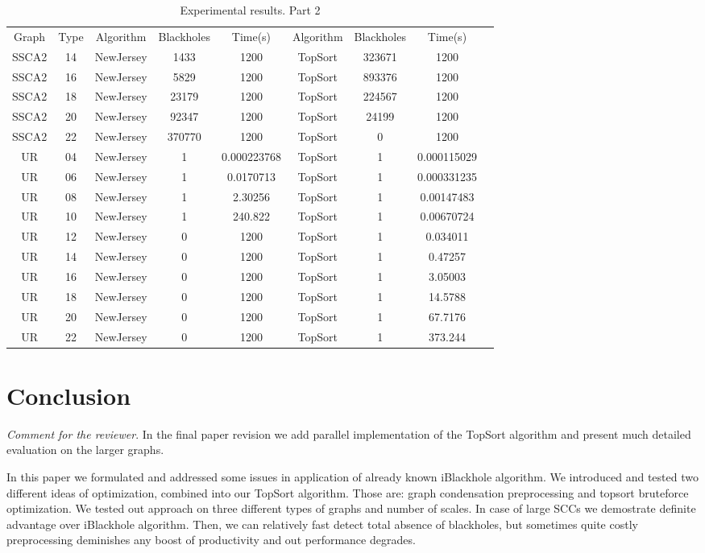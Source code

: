 \documentclass{svproc}
\begin{document}
\begin{table}[]
\caption{Experimental results. Part 2}
\label{tabular:tableresults2}
\begin{center}
\begin{tabular}{c|c|c|c|c|c|c|c|c}
Graph & Type & Algorithm & Blackholes & Time(s) & Algorithm & Blackholes & Time(s) \\
SSCA2 & 14 & NewJersey & 1433 & 1200 & TopSort & 323671 & 1200 \\
SSCA2 & 16 & NewJersey & 5829 & 1200 & TopSort & 893376 & 1200 \\
SSCA2 & 18 & NewJersey & 23179 & 1200 & TopSort & 224567 & 1200 \\
SSCA2 & 20 & NewJersey & 92347 & 1200 & TopSort & 24199 & 1200 \\
SSCA2 & 22 & NewJersey & 370770 & 1200 & TopSort & 0 & 1200 \\
UR & 04 & NewJersey & 1 & 0.000223768 & TopSort & 1 & 0.000115029 \\
UR & 06 & NewJersey & 1 & 0.0170713 & TopSort & 1 & 0.000331235 \\
UR & 08 & NewJersey & 1 & 2.30256 & TopSort & 1 & 0.00147483 \\
UR & 10 & NewJersey & 1 & 240.822 & TopSort & 1 & 0.00670724 \\
UR & 12 & NewJersey & 0 & 1200 & TopSort & 1 & 0.034011 \\
UR & 14 & NewJersey & 0 & 1200 & TopSort & 1 & 0.47257 \\
UR & 16 & NewJersey & 0 & 1200 & TopSort & 1 & 3.05003 \\
UR & 18 & NewJersey & 0 & 1200 & TopSort & 1 & 14.5788 \\
UR & 20 & NewJersey & 0 & 1200 & TopSort & 1 & 67.7176 \\
UR & 22 & NewJersey & 0 & 1200 & TopSort & 1 & 373.244
\end{tabular}
\end{center}
\end{table}
\pagebreak

\section{Conclusion}

\textit{Comment for the reviewer}. In the final paper revision we add parallel implementation of the TopSort algorithm and present much detailed evaluation on the larger graphs. 

In this paper we formulated and addressed some issues in application of already known iBlackhole algorithm. We introduced and tested two different ideas of optimization, combined into
our TopSort algorithm. Those are: graph condensation preprocessing and topsort bruteforce optimization. We tested out approach on three different types of graphs and number of scales.
In case of large SCCs we demostrate definite advantage over iBlackhole algorithm. Then, we can relatively fast detect total absence of blackholes, but sometimes quite costly preprocessing
deminishes any boost of productivity and out performance degrades.
\end{document}
